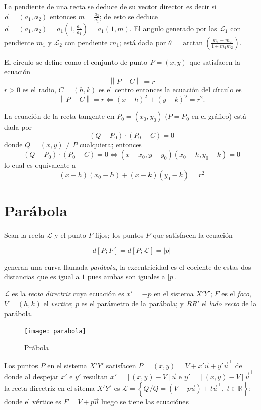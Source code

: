 \documentclass[10pt,]{krantz}
\theoremstyle{definition}
\theoremstyle{definition}
\theoremstyle{definition}
\theoremstyle{remark}
\begin{document}
La pendiente de una recta se deduce de su vector director es decir si \(\vec{a}=(a_1,a_2)\) entonces \(m=\frac{a_2}{a_1}\); de esto se deduce \(\vec{a}=(a_1,a_2)=a_1(1,\frac{a_2}{a_1})=a_1(1,m)\). El angulo generado por las \(\mathcal{L}_1\) con pendiente \(m_1\) y \(\mathcal{L}_2\) con pendiente \(m_1\); está dada por \(\theta=\arctan\left(\frac{m_1-m_2}{1+m_1m_2}\right)\).

El círculo se define como el conjunto de punto \(P=(x,y)\) que satisfacen la ecuación \[\left \|P-C\right\|=r\] \(r>0\) es el radio, \(C=(h,k)\) es el centro entonces la ecuación del círculo es \[\left \|P-C\right\|=r\iff (x-h)^2+(y-k)^2=r^2.\]

La ecuación de la recta tangente en \(P_0=(x_0,y_0)\) (\(P=P_0\) en el gráfico) está dada por \[(Q-P_0)\cdot(P_0-C)=0\] donde \(Q=(x,y)\neq P\) cualquiera; entonces \[(Q-P_0)\cdot(P_0-C)=0\iff  (x-x_0,y-y_0)(x_0-h,y_0-k)=0\] lo cual es equivalente a \[(x-h)(x_0-h)+(x-k)(y_0-k)=r^2\]

\hypertarget{paruxe1bola}{%
\chapter{Parábola}\label{paruxe1bola}}

Sean la recta \(\mathcal{L}\) y el punto \(F\) fijos; los puntos \(P\) que satisfacen la ecuación

\begin{equation} 
d\left[P;F\right]=d\left[P;\mathcal{L}\right]=\left|p\right|\label{eq:www}
\end{equation}

generan una curva llamada \emph{parábola}, la excentricidad es el cociente de estas dos distancias que es igual a \(1\) pues ambas son iguales a \(\left|p\right|\).

\(\mathcal{L}\) es la \emph{recta directriz} cuya ecuación es \(x'=-p\) en el sistema \(X'Y'\); \(F\) es el \emph{foco}, \(V=(h,k)\) el \emph{vertice}; \(p\) es el parámetro de la parábola; y \(RR'\) el \emph{lado recto} de la parábola.

\begin{figure}

{\centering \texttt{[image: parabola]} 

}

\caption{Prábola}\label{fig:hiperbola1}
\end{figure}

Los puntos \(P\) en el sistema \(X'Y'\) satisfacen
\(P=(x,y)=V+x'\vec{u}+y'\vec{u}^\perp\) de donde al despejar \(x'\) e \(y'\) resultan \(x'=[(x,y)-V]\vec{u}\) e \(y'=[(x,y)-V]\vec{u}^\perp\)
la recta directriz en el sitema \(X'Y'\) es
\(\mathcal{L}=\left\{Q/Q=(V-p\vec{u})+t\vec{u}^\perp,\:t\in \mathbb{R}\right\}\); donde el vértice es \(F=V+p\vec{u}\) luego se tiene las ecuaciónes
\end{document}
